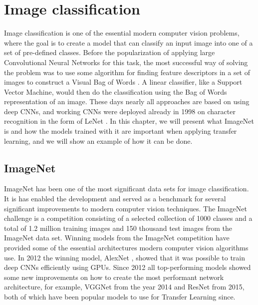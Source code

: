 \chapter{Image classification}
Image classification is one of the essential modern computer vision problems, where the goal is to create a model that can classify an input image into one of a set of pre-defined classes. Before the popularization of applying large Convolutional Neural Networks for this task, the most successful way of solving the problem was to use some algorithm for finding feature descriptors in a set of images to construct a Visual Bag of Words \citep{vbow}.  A linear classifier, like a Support Vector Machine, would then do the classification using the Bag of Words representation of an image. These days nearly all approaches are based on using deep CNNs, and working CNNs were deployed already in 1998 on character recognition in the form of LeNet \citep{leNet}.
In this chapter, we will present what ImageNet \citep{imagenet} is and how the models trained with it are important when applying transfer learning, and we will show an example of how it can be done.


\section{ImageNet}

ImageNet \citep{imagenet} has been one of the most significant data sets for image classification. 
It is has enabled the development and served as a benchmark for several significant improvements to modern computer vision techniques.
The ImageNet challenge \citep{ILSVRC} is a competition consisting of a selected collection of 1000 classes and a total of 1.2 million training images and 150 thousand test images from the ImageNet data set.
Winning models from the ImageNet competition have provided some of the essential architectures modern computer vision algorithms use.
In 2012 the winning model, AlexNet \citep{alexNet}, showed that it was possible to train deep CNNs efficiently using GPUs. Since 2012 all top-performing models showed some new improvements on how to create the most performant network architecture, for example, VGGNet \citep{VGG} from the year 2014 and ResNet \citep{resNet} from 2015, both of which have been popular models to use for Transfer Learning since.

